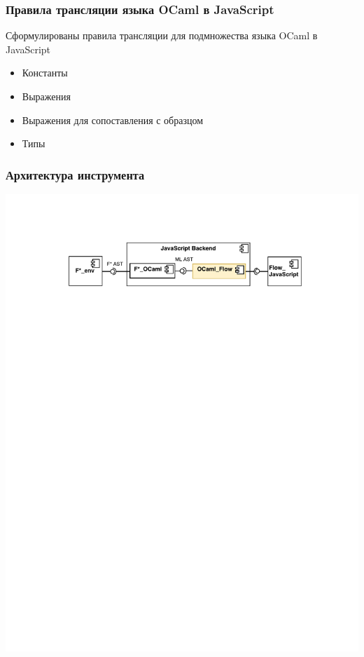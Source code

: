 \documentclass{beamer}
\begin{document}
\begin{frame}
\transwipe[direction=90]
\frametitle{Правила трансляции языка OCaml в JavaScript}

Сформулированы правила трансляции для подмножества языка OCaml в JavaScript
\begin{itemize}
\item Константы
\item Выражения
\item Выражения для сопоставления с образцом
\item Типы
\end{itemize}

\end{frame}


\begin{frame}
\transwipe[direction=90]
\frametitle{Архитектура инструмента}

\begin{center}
   {\includegraphics[width=.9\linewidth]{DiagComp}}
\end{center}

\end{frame}
\end{document}
